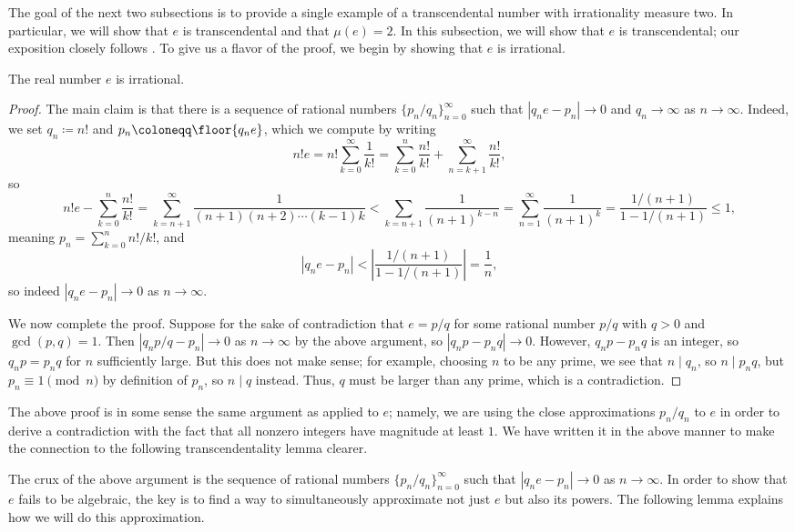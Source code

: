 \documentclass[../notes.tex]{subfiles}
\begin{document}
The goal of the next two subsections is to provide a single example of a transcendental number with irrationality measure two. In particular, we will show that $e$ is transcendental and that $\mu(e)=2$. In this subsection, we will show that $e$ is transcendental; our exposition closely follows \cite{conrad-e-trans}. To give us a flavor of the proof, we begin by showing that $e$ is irrational.
\begin{proposition} \label{prop:e-irrat}
	The real number $e$ is irrational.
\end{proposition}
\begin{proof}
	The main claim is that there is a sequence of rational numbers $\{p_n/q_n\}_{n=0}^\infty$ such that $\left|q_ne-p_n\right|\to0$ and $q_n\to\infty$ as $n\to\infty$. Indeed, we set $q_n\coloneqq n!$ and $p_n\coloneqq\floor{q_ne}$, which we compute by writing
	\[n!e=n!\sum_{k=0}^\infty\frac1{k!}=\sum_{k=0}^n\frac{n!}{k!}+\sum_{n=k+1}^\infty\frac{n!}{k!},\]
	so
	\[n!e-\sum_{k=0}^n\frac{n!}{k!}=\sum_{k=n+1}^\infty\frac1{(n+1)(n+2)\cdots(k-1)k}<\sum_{k=n+1}\frac1{(n+1)^{k-n}}=\sum_{n=1}^\infty\frac1{(n+1)^k}=\frac{1/(n+1)}{1-1/(n+1)}\le1,\]
	meaning $p_n=\sum_{k=0}^nn!/k!$, and
	\[\left|q_ne-p_n\right|<\left|\frac{1/(n+1)}{1-1/(n+1)}\right|=\frac1n,\]
	so indeed $\left|q_ne-p_n\right|\to0$ as $n\to\infty$.

	We now complete the proof. Suppose for the sake of contradiction that $e=p/q$ for some rational number $p/q$ with $q>0$ and $\gcd(p,q)=1$. Then $\left|q_np/q-p_n\right|\to0$ as $n\to\infty$ by the above argument, so $\left|q_np-p_nq\right|\to0$. However, $q_np-p_nq$ is an integer, so $q_np=p_nq$ for $n$ sufficiently large. But this does not make sense; for example, choosing $n$ to be any prime, we see that $n\mid q_n$, so $n\mid p_nq$, but $p_n\equiv1\pmod n$ by definition of $p_n$, so $n\mid q$ instead. Thus, $q$ must be larger than any prime, which is a contradiction.
\end{proof}
\begin{remark}
	The above proof is in some sense the same argument as  applied to $e$; namely, we are using the close approximations $p_n/q_n$ to $e$ in order to derive a contradiction with the fact that all nonzero integers have magnitude at least $1$. We have written it in the above manner to make the connection to the following transcendentality lemma clearer.
\end{remark}
The crux of the above argument is the sequence of rational numbers $\{p_n/q_n\}_{n=0}^\infty$ such that $\left|q_ne-p_n\right|\to0$ as $n\to\infty$. In order to show that $e$ fails to be algebraic, the key is to find a way to simultaneously approximate not just $e$ but also its powers. The following lemma explains how we will do this approximation.
\end{document}
